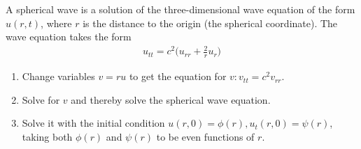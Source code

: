 \documentclass{report}
\begin{document}
\begin{question}{}{}
A spherical wave is a solution of the three-dimensional wave equation of the form $u(r,t)$, where $r$ is the distance to the origin (the spherical coordinate). The wave equation takes the form 
\begin{align*}
u_{tt}=c^2 \Big(u_{rr}+ \frac{2}{r}u_r \Big)
\end{align*}
\begin{enumerate}[label=(\alph*)]
  \item Change variables $v=ru$ to get the equation for $v:v_{tt}=c^2v_{rr}$. 
  \item Solve for $v$ and thereby solve the spherical wave equation. 
  \item Solve it with the initial condition $u(r,0)=\phi (r),u_t(r,0)= \psi (r)$, taking both $\phi (r)$ and $\psi (r)$ to be even functions of $r$. 
\end{enumerate}
\end{question}
\end{document}
